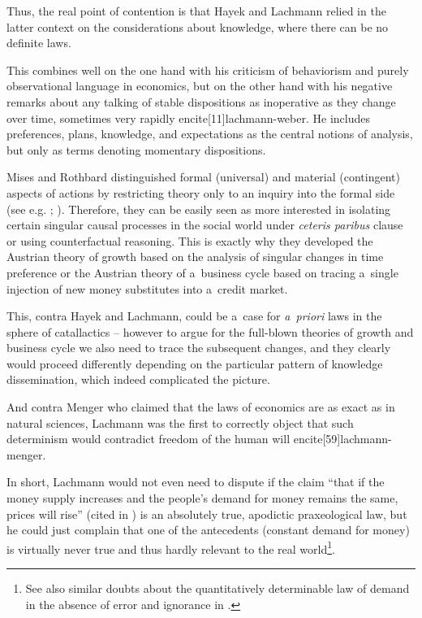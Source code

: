 {\begin{quote}
\end{quote}

Thus, the real point of contention is that Hayek and Lachmann relied in the latter context on the considerations about knowledge, where there can be no definite laws.

This combines well on the one hand with his criticism of behaviorism and purely observational language in economics, but on the other hand with his negative remarks about any talking of stable dispositions as inoperative as they change over time, sometimes very rapidly encite[11]{lachmann-weber}. He includes preferences, plans, knowledge, and expectations as the central notions of analysis, but only as terms denoting momentary dispositions.



Mises and Rothbard distinguished formal (universal) and material (contingent) aspects of actions by restricting theory only to an inquiry into the formal side (see e.g. \cite[31--32]{mises-ha}; \cite[83]{rothbard-mes}). Therefore, they can be easily seen as more interested in isolating certain singular causal processes in the social world under \emph{ceteris paribus} clause or using counterfactual reasoning. This is exactly why they developed the Austrian theory of growth based on the analysis of singular changes in time preference or the Austrian theory of a~business cycle based on tracing a~single injection of new money substitutes into a~credit market.

This, contra Hayek and Lachmann, could be a~case for \emph{a~priori} laws in the sphere of catallactics -- however to argue for the full-blown theories of growth and business cycle we also need to trace the subsequent changes, and they clearly would proceed differently depending on the particular pattern of knowledge dissemination, which indeed complicated the picture.

And contra Menger who claimed that the laws of economics are as exact as in natural sciences, Lachmann was the first to correctly object that such determinism would contradict freedom of the human will encite[59]{lachmann-menger}.

In short, Lachmann would not even need to dispute if the claim ``that if the money supply increases and the people's demand for money remains the same, prices will rise'' (cited in \cite[52]{rothbard-present}) is an absolutely true, apodictic praxeological law, but he could just complain that one of the antecedents (constant demand for money) is virtually never true and thus hardly relevant to the real world\footnote{See also similar doubts about the quantitatively determinable law of demand in the absence of error and ignorance in \textcite[58]{lachmann-menger}.}.



}

